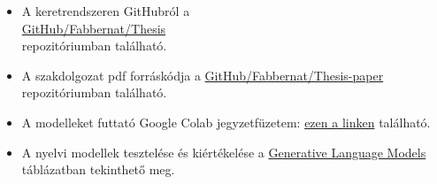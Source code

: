 \documentclass[12pt]{report}
\theoremstyle{definition}
\begin{document}
\begin{itemize}
\item A keretrendszeren GitHubról a\\ \href{https://github.com/Fabbernat/Thesis}{GitHub/Fabbernat/Thesis}\\ repozitóriumban található.

\item A szakdolgozat pdf forráskódja a \href{https://github.com/Fabbernat/Thesis-paper}{GitHub/Fabbernat/Thesis-paper}\\ repozitóriumban található.

    \item
\label{att:colab}
A modelleket futtató Google Colab jegyzetfüzetem:
\href{https://colab.research.google.com/drive/1yA8IAd5z2oreKUXha-16Du2YrNhemNiU?usp=sharing}{ezen a linken}  található.

\item A nyelvi modellek tesztelése és kiértékelése a
\href{https://docs.google.com/spreadsheets/d/1y49lg52LHVFmTom-0ibCqYqWA1pKKhiUny-Pf3KVTIg/edit?usp=sharing}{Generative Language Models}
táblázatban tekinthető meg.
\end{itemize}
\end{document}
